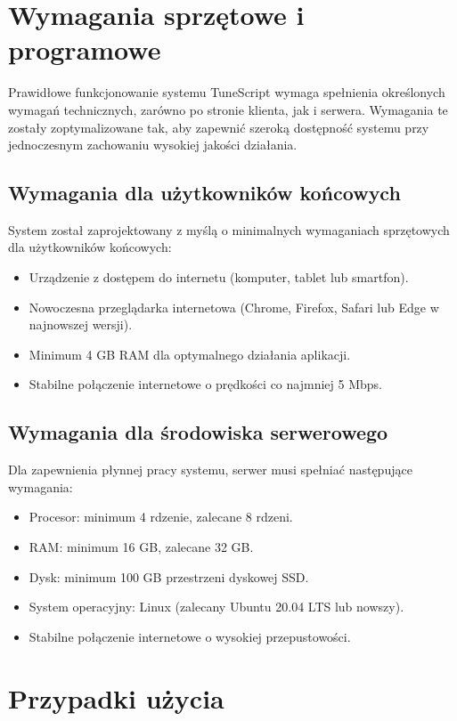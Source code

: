 \documentclass[a4paper,twoside,12pt]{book}
\begin{document}
\section{Wymagania sprzętowe i programowe}

Prawidłowe funkcjonowanie systemu TuneScript wymaga spełnienia określonych wymagań technicznych, zarówno po stronie klienta, jak i serwera. Wymagania te zostały zoptymalizowane tak, aby zapewnić szeroką dostępność systemu przy jednoczesnym zachowaniu wysokiej jakości działania.

\subsection{Wymagania dla użytkowników końcowych}
System został zaprojektowany z myślą o minimalnych wymaganiach sprzętowych dla użytkowników końcowych:

\begin{itemize}
	\item Urządzenie z dostępem do internetu (komputer, tablet lub smartfon).
	\item Nowoczesna przeglądarka internetowa (Chrome, Firefox, Safari lub Edge w najnowszej wersji).
	\item Minimum 4 GB RAM dla optymalnego działania aplikacji.
	\item Stabilne połączenie internetowe o prędkości co najmniej 5 Mbps.
\end{itemize}

\subsection{Wymagania dla środowiska serwerowego}
Dla zapewnienia płynnej pracy systemu, serwer musi spełniać następujące wymagania:

\begin{itemize}
	\item Procesor: minimum 4 rdzenie, zalecane 8 rdzeni.
	\item RAM: minimum 16 GB, zalecane 32 GB.
	\item Dysk: minimum 100 GB przestrzeni dyskowej SSD.
	\item System operacyjny: Linux (zalecany Ubuntu 20.04 LTS lub nowszy).
	\item Stabilne połączenie internetowe o wysokiej przepustowości.
\end{itemize}

\section{Przypadki użycia}
\end{document}
